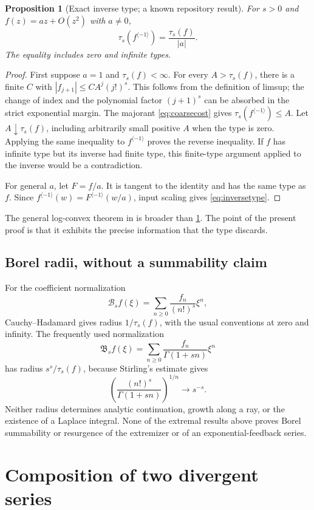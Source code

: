 \documentclass[11pt,a4paper]{article}
\newtheorem{proposition}[theorem]{Proposition}
\theoremstyle{definition}
\theoremstyle{remark}
\newcommand{\typ}{\tau_s}
\newcommand{\inv}{^{\langle-1\rangle}}
\numberwithin{equation}{section}
\begin{document}
\begin{proposition}[Exact inverse type; a known repository result]
\label{prop:inverse-type}
For $s>0$ and $f(z)=az+O(z^2)$ with $a\ne0$,
\begin{equation}
 \typ(f\inv)=\frac{\typ(f)}{|a|}.
 \label{eq:inversetype}
\end{equation}
The equality includes zero and infinite types.
\end{proposition}
\begin{proof}
First suppose $a=1$ and $\typ(f)<\infty$. For every $A>\typ(f)$,
there is a finite $C$ with $|f_{j+1}|\le CA^j(j!)^s$. This follows
from the definition of limsup; the change of index and the polynomial
factor $(j+1)^s$ can be absorbed in the strict exponential margin.
The majorant \eqref{eq:coarsecost} gives $\typ(f\inv)\le A$.
Let $A\downarrow\typ(f)$, including arbitrarily small positive $A$
when the type is zero. Applying the same inequality to $f\inv$ proves
the reverse inequality. If $f$ has infinite type but its inverse had
finite type, this finite-type argument applied to the inverse would be
a contradiction.

For general $a$, let $F=f/a$. It is tangent to the identity and has the
same type as $f$. Since $f\inv(w)=F\inv(w/a)$, input scaling gives
\eqref{eq:inversetype}.
\end{proof}

The general log-convex theorem in \cite{weighted} is broader than
\cref{prop:inverse-type}. The point of the present proof is that it
exhibits the precise information that the type discards.

\subsection{Borel radii, without a summability claim}
For the coefficient normalization
\[
 \mathcal B_s f(\xi)=\sum_{n\ge0}\frac{f_n}{(n!)^s}\xi^n,
\]
Cauchy--Hadamard gives radius $1/\typ(f)$, with the usual conventions at
zero and infinity. The frequently used normalization
\[
 \mathfrak B_s f(\xi)=\sum_{n\ge0}\frac{f_n}{\Gamma(1+sn)}\xi^n
\]
has radius $s^s/\typ(f)$, because Stirling's estimate gives
\[
 \left(\frac{(n!)^s}{\Gamma(1+sn)}\right)^{1/n}\longrightarrow s^{-s}.
\]
Neither radius determines analytic continuation, growth along a ray, or
the existence of a Laplace integral. None of the extremal results above
proves Borel summability or resurgence of the extremizer or of an
exponential-feedback series.

\section{Composition of two divergent series}\label{sec:composition}
\end{document}
